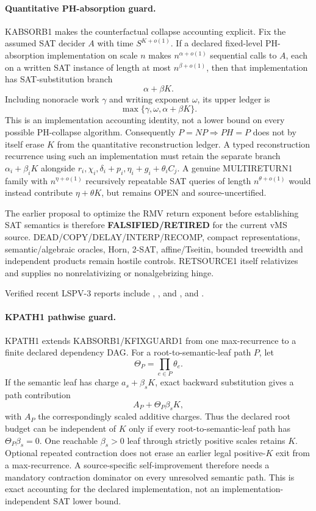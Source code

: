 \documentclass[11pt]{article}
\begin{document}
\paragraph{Quantitative PH-absorption guard.}
KABSORB1 makes the counterfactual collapse accounting explicit. Fix the assumed SAT decider \(A\) with time \(S^{K+o(1)}\). If a declared fixed-level PH-absorption implementation on scale \(n\) makes \(n^{\alpha+o(1)}\) sequential calls to \(A\), each on a written SAT instance of length at most \(n^{\beta+o(1)}\), then that implementation has SAT-substitution branch
\[
\alpha+\beta K.
\]
Including nonoracle work \(\gamma\) and writing exponent \(\omega\), its upper ledger is
\[
\max\{\gamma,\omega,\alpha+\beta K\}.
\]
This is an implementation accounting identity, not a lower bound on every possible PH-collapse algorithm. Consequently \(P=NP\Rightarrow PH=P\) does not by itself erase \(K\) from the quantitative reconstruction ledger. A typed reconstruction recurrence using such an implementation must retain the separate branch \(\alpha_i+\beta_iK\) alongside \(r_i,\chi_i,\delta_i+p_i,\eta_i+g_i+\theta_iC_j\). A genuine MULTIRETURN1 family with \(n^{\eta+o(1)}\) recursively repeatable SAT queries of length \(n^{\theta+o(1)}\) would instead contribute \(\eta+\theta K\), but remains OPEN and source-uncertified.

The earlier proposal to optimize the RMV return exponent before establishing SAT semantics is therefore \textbf{FALSIFIED/RETIRED} for the current vMS source. DEAD/COPY/DELAY/INTERP/RECOMP, compact representations, semantic/algebraic oracles, Horn, 2-SAT, affine/Tseitin, bounded treewidth and independent products remain hostile controls. RETSOURCE1 itself relativizes and supplies no nonrelativizing or nonalgebrizing hinge.

Verified recent LSPV-3 reports include
,
, and
, and
.

\paragraph{KPATH1 pathwise guard.}
KPATH1 extends KABSORB1/KFIXGUARD1 from one max-recurrence to a finite declared dependency DAG. For a root-to-semantic-leaf path \(P\), let
\[
\Theta_P=\prod_{e\in P}\theta_e.
\]
If the semantic leaf has charge \(a_s+\beta_sK\), exact backward substitution gives a path contribution
\[
A_P+\Theta_P\beta_sK,
\]
with \(A_P\) the correspondingly scaled additive charges. Thus the declared root budget can be independent of \(K\) only if every root-to-semantic-leaf path has \(\Theta_P\beta_s=0\). One reachable \(\beta_s>0\) leaf through strictly positive scales retains \(K\). Optional repeated contraction does not erase an earlier legal positive-\(K\) exit from a max-recurrence. A source-specific self-improvement therefore needs a mandatory contraction dominator on every unresolved semantic path. This is exact accounting for the declared implementation, not an implementation-independent SAT lower bound.
\end{document}
